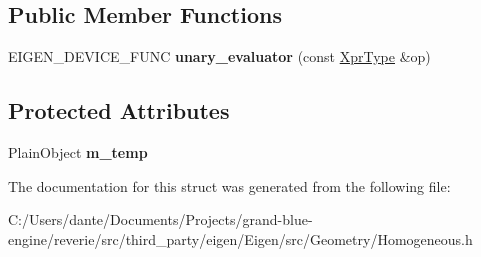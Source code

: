 \subsection*{Public Member Functions}
\begin{DoxyCompactItemize}
\item 
\mbox{\label{struct_eigen_1_1internal_1_1unary__evaluator_3_01_homogeneous_3_01_arg_type_00_01_direction_01_4_00_01_index_based_01_4_a2dc020a67e6c1dfc3e3566e02587ab45}} 
E\+I\+G\+E\+N\+\_\+\+D\+E\+V\+I\+C\+E\+\_\+\+F\+U\+NC {\bfseries unary\+\_\+evaluator} (const \mbox{\hyperlink{class_eigen_1_1_homogeneous}{Xpr\+Type}} \&op)
\end{DoxyCompactItemize}
\subsection*{Protected Attributes}
\begin{DoxyCompactItemize}
\item 
\mbox{\label{struct_eigen_1_1internal_1_1unary__evaluator_3_01_homogeneous_3_01_arg_type_00_01_direction_01_4_00_01_index_based_01_4_ad539b27f1aad1bb5b11ffe06daad1a8f}} 
Plain\+Object {\bfseries m\+\_\+temp}
\end{DoxyCompactItemize}


The documentation for this struct was generated from the following file\+:\begin{DoxyCompactItemize}
\item 
C\+:/\+Users/dante/\+Documents/\+Projects/grand-\/blue-\/engine/reverie/src/third\+\_\+party/eigen/\+Eigen/src/\+Geometry/Homogeneous.\+h\end{DoxyCompactItemize}

